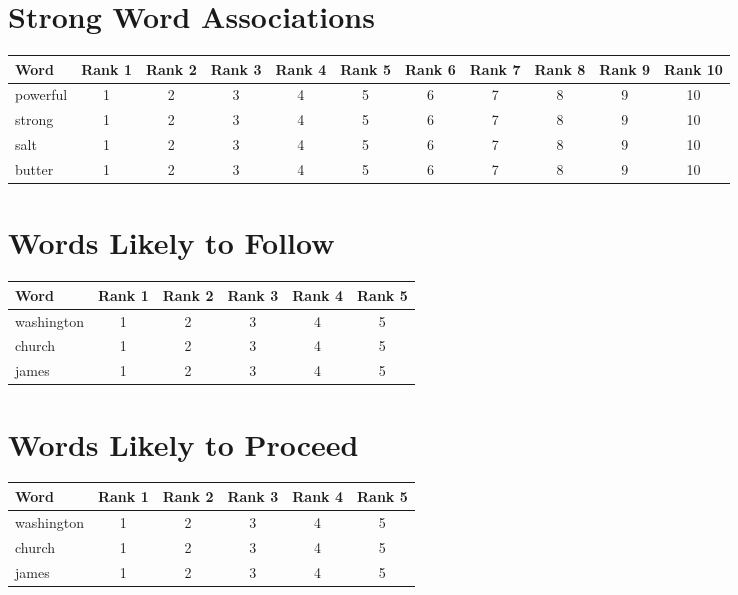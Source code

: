 \documentclass[paper=a4, fontsize=11pt]{scrartcl} %
\numberwithin{equation}{section} %
\numberwithin{figure}{section} %
\numberwithin{table}{section} %
\begin{document}
\section{Strong Word Associations}

\hspace{-2 cm}
\begin{tabular}{ |l |c | c | c |c |c | c | c| c| c| c|}
Word & Rank 1 & Rank 2 & Rank 3 & Rank 4 & Rank 5 & Rank 6 & Rank 7 & Rank 8 & Rank 9 & Rank 10 \\
\hline
  powerful & 1 & 2 & 3 & 4 & 5 & 6 & 7 & 8 & 9 & 10 \\
  strong & 1 & 2 & 3 & 4 & 5 & 6 & 7 & 8 & 9 & 10 \\
  salt & 1 & 2 & 3 & 4 & 5 & 6 & 7 & 8 & 9 & 10 \\
  butter & 1 & 2 & 3 & 4 & 5 & 6 & 7 & 8 & 9 & 10 \\
\end{tabular}


\section {Words Likely to Follow}

\begin{tabular}{| l | c | c | c | c | c |}
Word & Rank 1 & Rank 2 & Rank 3 & Rank 4 & Rank 5 \\
\hline
  washington & 1 & 2 & 3 & 4 & 5  \\
  church & 1 & 2 & 3 & 4 & 5  \\
  james & 1 & 2 & 3 & 4 & 5  \\
\end{tabular}


\section {Words Likely to Proceed}

\begin{tabular}{| l | c | c | c | c | c |}
Word & Rank 1 & Rank 2 & Rank 3 & Rank 4 & Rank 5 \\
\hline
  washington & 1 & 2 & 3 & 4 & 5  \\
  church & 1 & 2 & 3 & 4 & 5  \\
  james & 1 & 2 & 3 & 4 & 5  \\
\end{tabular}
\end{document}
